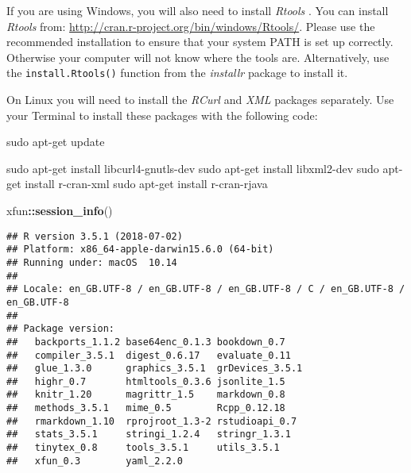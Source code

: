 \documentclass[]{krantz}
\makeatletter
\newenvironment{Shaded}{\begin{snugshade}}{\end{snugshade}}
\newcommand{\FunctionTok}[1]{\textcolor[rgb]{0,0,0}{#1}}
\newcommand{\KeywordTok}[1]{\textcolor[rgb]{0.27,0.27,0.27}{\textbf{#1}}}
\newcommand{\NormalTok}[1]{#1}
\newcommand{\OperatorTok}[1]{\textcolor[rgb]{0.43,0.43,0.43}{\textbf{#1}}}
\newenvironment{kframe}{%
\medskip{}
\setlength{\fboxsep}{.8em}
 \def\at@end@of@kframe{}%
 \ifinner\ifhmode%
  \def\at@end@of@kframe{\end{minipage}}%
  \begin{minipage}{\columnwidth}%
 \fi\fi%
 \def\FrameCommand##1{\hskip\@totalleftmargin \hskip-\fboxsep
 \colorbox{shadecolor}{##1}\hskip-\fboxsep
     \hskip-\linewidth \hskip-\@totalleftmargin \hskip\columnwidth}%
 \MakeFramed {\advance\hsize-\width
   \@totalleftmargin\z@ \linewidth\hsize
   \@setminipage}}%
 {\par\unskip\endMakeFramed%
 \at@end@of@kframe}
\renewenvironment{Shaded}{\begin{kframe}}{\end{kframe}}
\theoremstyle{definition}
\theoremstyle{definition}
\theoremstyle{definition}
\theoremstyle{remark}
\makeatother
\begin{document}

If you are using Windows, you will also need to install \emph{Rtools}
\cite[]{Rtools}. You can install \emph{Rtools} from:
\url{http://cran.r-project.org/bin/windows/Rtools/}.\label{RtoolsDownload}
Please use the recommended installation to ensure that your system
PATH is set up correctly. Otherwise your computer will not
know where the tools are. Alternatively, use the
\texttt{install.Rtools()} function from the \emph{installr}
\citep{galili2018} package to install it.



On Linux you will need to install the \emph{RCurl}
\citep{R-RCurl} and \emph{XML} \citep{R-XML}
packages separately. Use your Terminal to install these
packages with the following code:

\begin{Shaded}
\begin{Highlighting}[]
\FunctionTok{sudo}\NormalTok{ apt-get update}

\FunctionTok{sudo}\NormalTok{ apt-get install libcurl4-gnutls-dev}
\FunctionTok{sudo}\NormalTok{ apt-get install libxml2-dev}
\FunctionTok{sudo}\NormalTok{ apt-get install r-cran-xml}
\FunctionTok{sudo}\NormalTok{ apt-get install r-cran-rjava}
\end{Highlighting}
\end{Shaded}


\begin{Shaded}
\begin{Highlighting}[]
\NormalTok{xfun}\OperatorTok{::}\KeywordTok{session_info}\NormalTok{()}
\end{Highlighting}
\end{Shaded}

\begin{verbatim}
## R version 3.5.1 (2018-07-02)
## Platform: x86_64-apple-darwin15.6.0 (64-bit)
## Running under: macOS  10.14
## 
## Locale: en_GB.UTF-8 / en_GB.UTF-8 / en_GB.UTF-8 / C / en_GB.UTF-8 / en_GB.UTF-8
## 
## Package version:
##   backports_1.1.2 base64enc_0.1.3 bookdown_0.7   
##   compiler_3.5.1  digest_0.6.17   evaluate_0.11  
##   glue_1.3.0      graphics_3.5.1  grDevices_3.5.1
##   highr_0.7       htmltools_0.3.6 jsonlite_1.5   
##   knitr_1.20      magrittr_1.5    markdown_0.8   
##   methods_3.5.1   mime_0.5        Rcpp_0.12.18   
##   rmarkdown_1.10  rprojroot_1.3-2 rstudioapi_0.7 
##   stats_3.5.1     stringi_1.2.4   stringr_1.3.1  
##   tinytex_0.8     tools_3.5.1     utils_3.5.1    
##   xfun_0.3        yaml_2.2.0
\end{verbatim}
\end{document}
